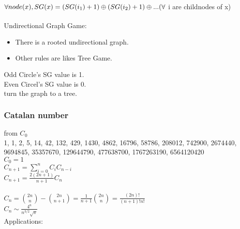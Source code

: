 $\forall node(x),\\
        SG(x)=(SG(i_1)+1)\oplus (SG(i_2)+1)\oplus ... (\forall$ i are childnodes of x)\\
        \\
Undirectional Graph Game:
\begin{itemize}
\item There is a rooted undirectional graph.
\item Other rules are likes Tree Game.
\end{itemize}
Odd Circle's SG value is 1.\\
Even Circel's SG value is 0.\\
turn the graph to a tree.\\

\subsubsection{Catalan number}
from $C_0$\\
1, 1, 2, 5, 14, 42, 132, 429, 1430, 4862, 16796, 58786, 208012, 742900, 2674440, 9694845, 35357670, 129644790, 477638700, 1767263190, 6564120420\\
$C_0=1$\\
$C_{n+1}=\sum\limits_{i=0}^nC_iC_{n-i}$\\
$C_{n+1}=\frac{2(2n+1)}{n+1}C_n$\\
\\
$C_n=\binom{2n}{n}-\binom{2n}{n+1}=\frac{1}{n+1}\binom{2n}{n}=\frac{(2n)!}{(n+1)!n!}$\\
$C_n \sim \frac{4^n}{n^{3/2}\sqrt{\pi}}$\\
Applications:\\
